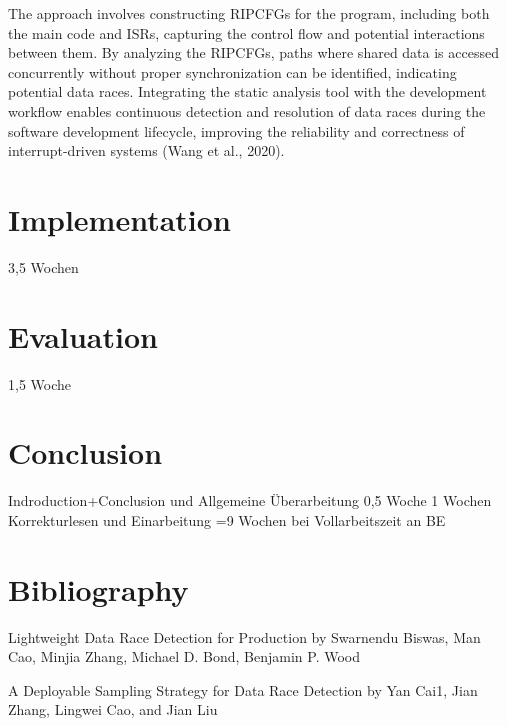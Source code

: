 \documentclass[
fancyheadings, %
%
%
]{stsreprt}
\begin{document}
{The approach involves constructing RIPCFGs for the program, including both the main code and ISRs, capturing the control flow and potential interactions between them. By analyzing the RIPCFGs, paths where shared data is accessed concurrently without proper synchronization can be identified, indicating potential data races. Integrating the static analysis tool with the development workflow enables continuous detection and resolution of data races during the software development lifecycle, improving the reliability and correctness of interrupt-driven systems 
(Wang et al., 2020).

\chapter{Implementation}
3,5 Wochen
\chapter{Evaluation}
1,5 Woche 
\chapter{Conclusion}
Indroduction+Conclusion und Allgemeine Überarbeitung 0,5 Woche
1 Wochen Korrekturlesen und Einarbeitung
=9 Wochen bei Vollarbeitszeit an BE
\appendix
}
\backmatter{}
\chapter{Bibliography}
Lightweight Data Race Detection for Production by Swarnendu Biswas, Man Cao, Minjia Zhang, Michael D. Bond, Benjamin P. Wood


A Deployable Sampling Strategy for Data Race Detection by Yan Cai1, Jian Zhang, Lingwei Cao, and Jian Liu
\end{document}
